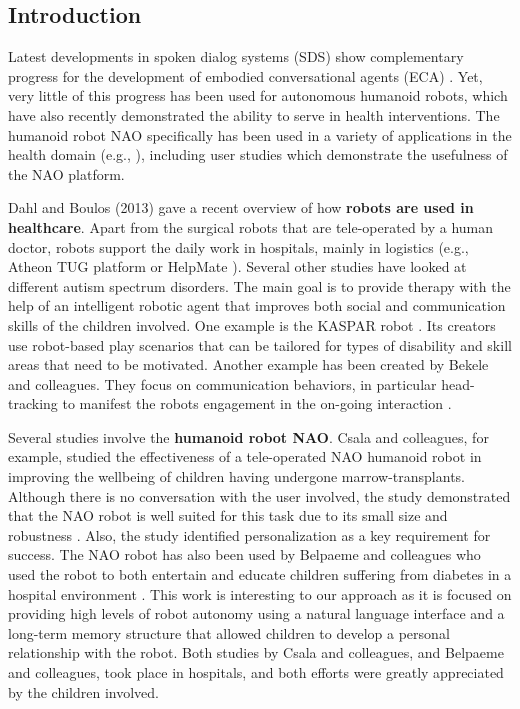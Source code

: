 \documentclass[letterpaper]{article}
\begin{document}
\begin{sloppy}
\section{Introduction} \label{intro}

Latest developments in spoken dialog systems (SDS) show complementary progress for the development of  embodied conversational agents (ECA) \cite{YASCLL14}. Yet, very little of
this progress has been used for autonomous humanoid robots, which have also recently demonstrated the ability
to serve in health interventions. The
humanoid robot NAO specifically has been used in a variety of applications in the health domain (e.g.,
\cite{MAJA13}), including user studies which demonstrate the usefulness of the NAO platform.

Dahl and Boulos (2013) \nocite{robotics3010001} gave a recent overview of how {\bf robots are used in
healthcare}. Apart from the  surgical robots that are tele-operated by a human doctor, robots support
the daily work in hospitals, mainly in logistics (e.g., Atheon TUG platform \cite{bloss2011mobile}
or HelpMate \cite{evans1998helpmate}). Several other studies have looked at different autism
spectrum disorders. The main goal is to provide therapy with the help of an intelligent robotic
agent that improves both social and communication skills of the children involved. One example is
the KASPAR robot \cite{robins2012scenarios}. Its creators use robot-based play scenarios that can
be tailored for types of disability and skill areas that need to be motivated. Another example has
been created by Bekele and colleagues. They focus on communication behaviors, in particular
head-tracking to manifest the robots engagement in the on-going interaction \cite{bekele2013step}.  


Several studies involve the {\bf humanoid robot NAO}. Csala and colleagues, for example,
studied the effectiveness of a tele-operated NAO humanoid robot in improving the wellbeing of
children having undergone marrow-transplants. Although there is no conversation with the user
involved, the study demonstrated that the NAO robot is well suited for this task due to its small
size and robustness \cite{Csala2012}. Also, the study identified personalization as a key
requirement for success. The NAO robot has also been used by Belpaeme and colleagues who used the
robot to both entertain and educate children suffering from diabetes in a hospital environment
\cite{belpaeme2012multimodal}. This work is interesting to our approach as it is focused on
providing high levels of robot autonomy using a natural language interface and a long-term memory
structure that allowed children to develop a personal relationship with the robot. Both studies by
Csala and colleagues, and Belpaeme and colleagues, took place in hospitals, and both efforts were
greatly appreciated by the children involved.


\end{sloppy}
\end{document}
